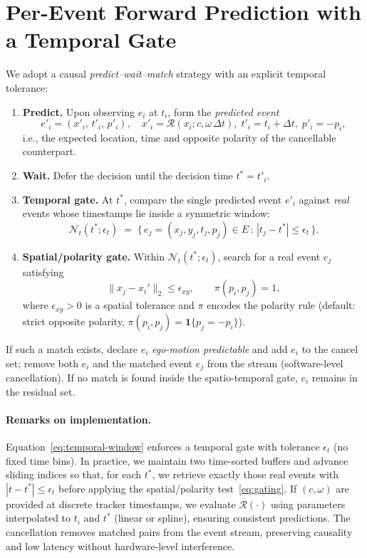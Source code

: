 \section{Per-Event Forward Prediction with a Temporal Gate}\label{sec:temporal_gate}
    We adopt a causal \emph{predict–wait–match} strategy with an explicit temporal tolerance:

\begin{enumerate}
  \item \textbf{Predict.} Upon observing $e_i$ at $t_i$, form the \emph{predicted event}
  \[
  e'_i = (x'_i,\,t'_i,\,p'_i),\quad x'_i=\mathcal{R}(x_i; c, \omega\,\Delta t),\; t'_i=t_i+\Delta t,\; p'_i=-p_i,
  \]
  i.e., the expected location, time and opposite polarity of the cancellable counterpart.
  \item \textbf{Wait.} Defer the decision until the decision time $t^*=t'_i$.
  \item \textbf{Temporal gate.} At $t^*$, compare the single predicted event $e'_i$ against \emph{real} events whose timestamps lie inside a symmetric window:
  \begin{equation}
  \mathcal{N}_t(t^*;\epsilon_t) \;=\; \{\, e_j=(x_j,y_j,t_j,p_j)\in E \,:\, |t_j - t^*| \le \epsilon_t \,\}.
  \label{eq:temporal-window}
  \end{equation}
  \item \textbf{Spatial/polarity gate.} Within $\mathcal{N}_t(t^*;\epsilon_t)$, search for a real event $e_j$ satisfying
  \begin{equation}
  \|x_j - x_i'\|_2 \le \epsilon_{xy},
  \qquad
  \pi(p_i,p_j)=1,
  \label{eq:gating}
  \end{equation}
  where $\epsilon_{xy}>0$ is a spatial tolerance and $\pi$ encodes the polarity rule (default: strict opposite polarity, $\pi(p_i,p_j)=\mathbf{1}\{p_j=-p_i\}$).
\end{enumerate}

If such a match exists, declare $e_i$ \emph{ego-motion predictable} and add $e_i$ to the cancel set; remove both $e_i$ and the matched event $e_j$ from the stream (software-level cancellation). If no match is found inside the spatio-temporal gate, $e_i$ remains in the residual set.

\paragraph{Remarks on implementation.}
Equation~\eqref{eq:temporal-window} enforces a temporal gate with tolerance $\epsilon_t$ (no fixed time bins). In practice, we maintain two time-sorted buffers and advance sliding indices so that, for each $t^*$, we retrieve exactly those real events with $|t - t^*| \le \epsilon_t$ before applying the spatial/polarity test~\eqref{eq:gating}. If $(c,\omega)$ are provided at discrete tracker timestamps, we evaluate $\mathcal{R}(\cdot)$ using parameters interpolated to $t_i$ and $t^*$ (linear or spline), ensuring consistent predictions. The cancellation removes matched pairs from the event stream, preserving causality and low latency without hardware-level interference.

